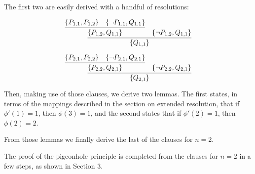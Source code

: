 \begin{appendices}
The first two are easily derived with a handful of resolutions:

\[
\infer{\{Q_{1,1}\}}{
  \infer{\{P_{1,2},Q_{1,1}\}}{
    \{P_{1,1},P_{1,2}\}
    &
    \{\neg P_{1,1},Q_{1,1}\}
  }
  &
  \{\neg P_{1,2}, Q_{1,1}\}
}
\]

\[
\infer{\{Q_{2,1}\}}{
  \infer{\{P_{2,2},Q_{2,1}\}}{
    \{P_{2,1},P_{2,2}\}
    &
    \{\neg P_{2,1},Q_{2,1}\}
  }
  &
  \{\neg P_{2,2}, Q_{2,1}\}
}
\]

Then, making use of those clauses, we derive two lemmas. The first states, in terms of the mappings described in the section on extended resolution, that if $\phi'(1) = 1$, then $\phi(3) = 1$, and the second states that if $\phi'(2) = 1$, then $\phi(2) = 2$.



From those lemmas we finally derive the last of the clauses for $n=2$.


The proof of the pigeonhole principle is completed from the clauses for $n=2$ in a few steps, as shown in Section 3.

\end{appendices}
